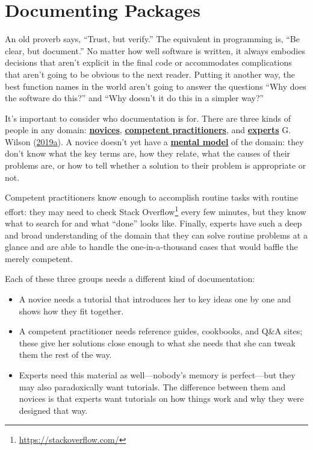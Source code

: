 \documentclass[
]{krantz}
\renewcommand{\href}[2]{#2\footnote{\url{#1}}}
\newcommand{\gref}[2]{\hyperlink{#2}{\textbf{#1}}}
\begin{document}
\hypertarget{packaging-document}{%
\section{Documenting Packages}\label{packaging-document}}

An old proverb says, ``Trust, but verify.''
The equivalent in programming is, ``Be clear, but document.''
No matter how well software is written,
it always embodies decisions that aren't explicit in the final code
or accommodates complications that aren't going to be obvious to the next reader.
Putting it another way,
the best function names in the world aren't going to answer the questions
``Why does the software do this?''
and
``Why doesn't it do this in a simpler way?''

It's important to consider who documentation is for.
There are three kinds of people in any domain:
\gref{novices}{novice},
\gref{competent practitioners}{competent\_practitioner},
and \gref{experts}{expert} G. Wilson (\protect\hyperlink{ref-Wils2018}{2019}\protect\hyperlink{ref-Wils2018}{a}).
A novice doesn't yet have a \gref{mental model}{mental\_model} of the domain:
they don't know what the key terms are,
how they relate,
what the causes of their problems are,
or how to tell whether a solution to their problem is appropriate or not.

Competent practitioners know enough to accomplish routine tasks with routine effort:
they may need to check \href{https://stackoverflow.com/}{Stack Overflow} every few minutes,
but they know what to search for and what ``done'' looks like.
Finally,
experts have such a deep and broad understanding of the domain
that they can solve routine problems at a glance
and are able to handle the one-in-a-thousand cases
that would baffle the merely competent.

Each of these three groups needs a different kind of documentation:

\begin{itemize}
\item
  A novice needs a tutorial that introduces her to key ideas one by one
  and shows how they fit together.
\item
  A competent practitioner needs reference guides, cookbooks, and Q\&A sites;
  these give her solutions close enough to what she needs
  that she can tweak them the rest of the way.
\item
  Experts need this material as well---nobody's memory is perfect---but
  they may also paradoxically want tutorials.
  The difference between them and novices is that experts want tutorials on how things work
  and why they were designed that way.
\end{itemize}
\end{document}
